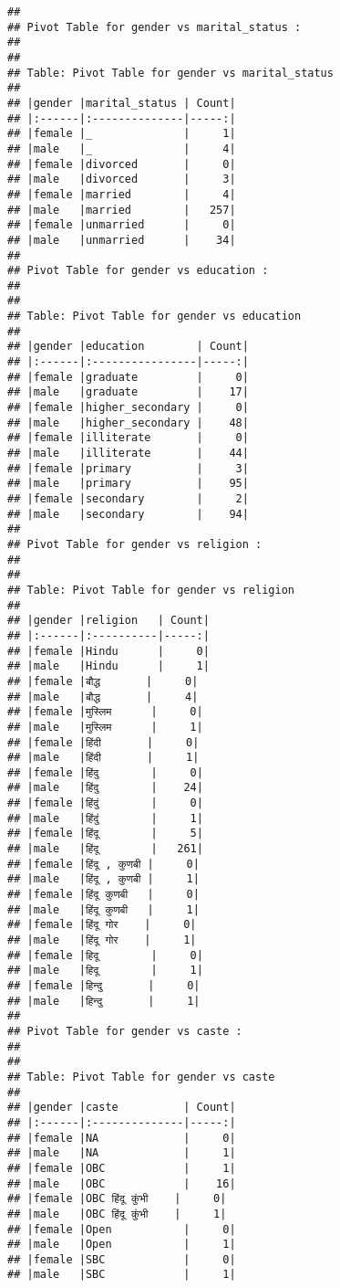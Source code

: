 \documentclass[
]{article}
\begin{document}
\begin{verbatim}
## 
## Pivot Table for gender vs marital_status :
## 
## 
## Table: Pivot Table for gender vs marital_status
## 
## |gender |marital_status | Count|
## |:------|:--------------|-----:|
## |female |_              |     1|
## |male   |_              |     4|
## |female |divorced       |     0|
## |male   |divorced       |     3|
## |female |married        |     4|
## |male   |married        |   257|
## |female |unmarried      |     0|
## |male   |unmarried      |    34|
## 
## Pivot Table for gender vs education :
## 
## 
## Table: Pivot Table for gender vs education
## 
## |gender |education        | Count|
## |:------|:----------------|-----:|
## |female |graduate         |     0|
## |male   |graduate         |    17|
## |female |higher_secondary |     0|
## |male   |higher_secondary |    48|
## |female |illiterate       |     0|
## |male   |illiterate       |    44|
## |female |primary          |     3|
## |male   |primary          |    95|
## |female |secondary        |     2|
## |male   |secondary        |    94|
## 
## Pivot Table for gender vs religion :
## 
## 
## Table: Pivot Table for gender vs religion
## 
## |gender |religion   | Count|
## |:------|:----------|-----:|
## |female |Hindu      |     0|
## |male   |Hindu      |     1|
## |female |बौद्ध       |     0|
## |male   |बौद्ध       |     4|
## |female |मुस्लिम      |     0|
## |male   |मुस्लिम      |     1|
## |female |हिंदी       |     0|
## |male   |हिंदी       |     1|
## |female |हिंदु        |     0|
## |male   |हिंदु        |    24|
## |female |हिंदुं        |     0|
## |male   |हिंदुं        |     1|
## |female |हिंदू        |     5|
## |male   |हिंदू        |   261|
## |female |हिंदू , कुणबी |     0|
## |male   |हिंदू , कुणबी |     1|
## |female |हिंदू कुणबी   |     0|
## |male   |हिंदू कुणबी   |     1|
## |female |हिंदू गोर    |     0|
## |male   |हिंदू गोर    |     1|
## |female |हिदू        |     0|
## |male   |हिदू        |     1|
## |female |हिन्दु       |     0|
## |male   |हिन्दु       |     1|
## 
## Pivot Table for gender vs caste :
## 
## 
## Table: Pivot Table for gender vs caste
## 
## |gender |caste          | Count|
## |:------|:--------------|-----:|
## |female |NA             |     0|
## |male   |NA             |     1|
## |female |OBC            |     1|
## |male   |OBC            |    16|
## |female |OBC हिंदू कुंभी    |     0|
## |male   |OBC हिंदू कुंभी    |     1|
## |female |Open           |     0|
## |male   |Open           |     1|
## |female |SBC            |     0|
## |male   |SBC            |     1|

\end{verbatim}
\end{document}
